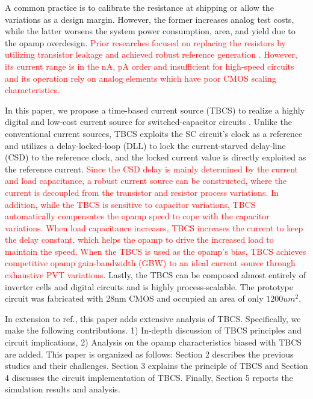 \documentclass[paper]{ieice}
\begin{document}
A common practice is to calibrate the resistance at shipping or allow the variations as a design margin. However, the former increases analog test costs, while the latter worsens the system power consumption, area, and yield due to the opamp overdesign. \textcolor{red}{Prior researches focused on replacing the resistors by utilizing transistor leakage and achieved robust reference generation \cite{hirose2010nano, hirose2010cmos, osaki20131, choi201423pw}. However, its current range is in the  nA, pA order and insufficient for high-speed circuits and its operation rely on analog elements which have poor CMOS scaling characteristics.}

In this paper, we propose a time-based current source (TBCS) to realize a highly digital and low-cost current source for switched-capacitor circuits \cite{yoshioka201728}. Unlike the conventional current sources, TBCS exploits the SC circuit's clock as a reference and utilizes a delay-locked-loop (DLL) to lock the current-starved delay-line (CSD) to the reference clock, and the locked current value is directly exploited as the reference current. 
\textcolor{red}{Since the CSD delay is mainly determined by the current and load capacitance, a robust current source can be constructed, where the current is decoupled from the transistor and resistor process variations. In addition, while the TBCS is sensitive to capacitor variations, TBCS automatically compensates the opamp speed to cope with the capacitor variations. 
When load capacitance increases, TBCS increases the current to keep the delay constant, which helps the opamp to drive the increased load to maintain the speed. When the TBCS is used as the opamp's bias, TBCS achieves competitive opamp gain-bandwidth (GBW) to an ideal current source through exhaustive PVT variations.}
Lastly, the TBCS can be composed almost entirely of inverter cells and digital circuits and is highly process-scalable. The prototype circuit was fabricated with 28nm CMOS and occupied an area of only $1200um^2$.

In extension to ref.\cite{yoshioka201728, yoshioka2019digital}, this paper adds extensive analysis of TBCS. Specifically, we make the following contributions. 1) In-depth discussion of TBCS principles and circuit implications, 2) Analysis on the opamp characteristics biased with TBCS are added.
This paper is organized as follows: Section 2 describes the previous studies and their challenges. Section 3 explains the principle of TBCS and Section 4 discusses the circuit implementation of TBCS. Finally, Section 5 reports the simulation results and analysis.
\end{document}
